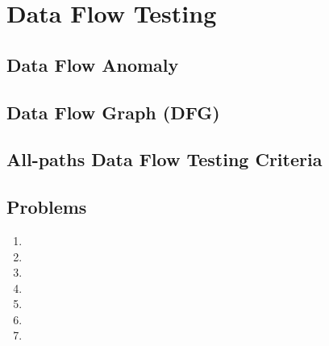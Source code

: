 \setchapterpreamble[u]{\margintoc}
\chapter{Data Flow Testing}
\section{Data Flow Anomaly}
\section{Data Flow Graph (DFG)}
\section{All-paths Data Flow Testing Criteria}
\section{Problems}
\begin{enumerate}
    \item 
    \item 
    \item 
    \item 
    \item 
    \item
    \item 
\end{enumerate}